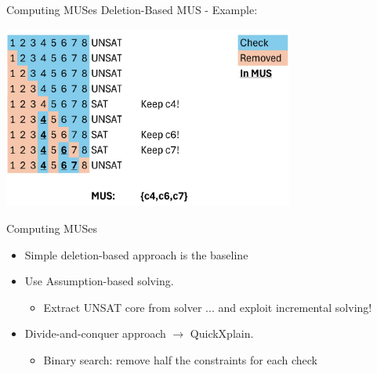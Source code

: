 \documentclass{cons-beamer}
\begin{document}
\begin{frame}{Computing MUSes}
  Deletion-Based MUS - Example:

  \begin{center}
    \includegraphics[height=60mm]{images/texpl_img/del-based-mus.png}
  \end{center}
\end{frame}

\begin{frame}{Computing MUSes}
  \begin{itemize}
    \item Simple deletion-based approach is the baseline
          \vfill \vfill

    \item Use Assumption-based solving.
          \begin{itemize}
            \item Extract UNSAT core from solver ... and exploit incremental solving!
          \end{itemize}
          \vfill \vfill

    \item Divide-and-conquer approach $\xrightarrow{}$ QuickXplain.
          \begin{itemize}
            \item Binary search: remove half the constraints for each check
          \end{itemize}
          \vfill \vfill

  \end{itemize}
\end{frame}
\end{document}
